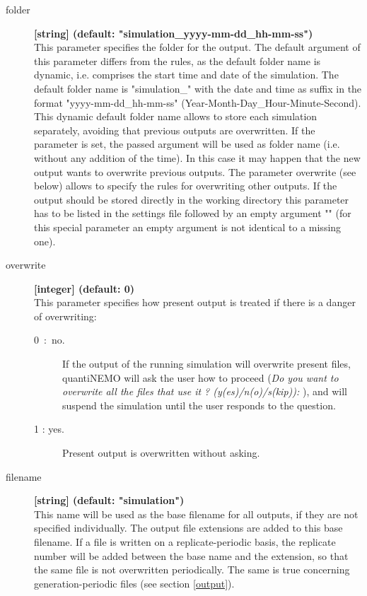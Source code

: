\documentclass[letterpaper,12pt,oneside]{book}
\begin{document}
\begin{description}
\item[folder]\textbf{[string] (default: "simulation\_yyyy-mm-dd\_hh-mm-ss")}\\
This parameter specifies the folder for the output. The default argument of this parameter differs from the rules, as the default folder name is dynamic, i.e. comprises the start time and date of the simulation. The default folder name is "simulation\_" with the date and time as suffix in the format "yyyy-mm-dd\_hh-mm-ss" (Year-Month-Day\_Hour-Minute-Second). This dynamic default folder name allows to store each simulation separately, avoiding that previous outputs are overwritten. If the parameter is set, the passed argument will be used as folder name (i.e. without any addition of the time). In this case it may happen that the new output wants to overwrite previous outputs. The parameter \textsf{overwrite} (see below) allows to specify the rules for overwriting other outputs. If the output should be stored directly in the working directory this parameter has to be listed in the settings file followed by an empty argument "" (for this special parameter an empty argument is not identical to a missing one).

\item[overwrite]\textbf{[integer] (default: 0)}\\
This parameter specifies how present output is treated if there is a danger of overwriting:
\begin{description}
\item[0~:~no.] If the output of the running simulation will overwrite present files, quantiNEMO will ask the user how to proceed (\textit{Do you want to overwrite all the files that use it ? (y(es)/n(o)/s(kip)):} ), and will suspend the simulation until the user responds to the question.
\item[1 : yes.] Present output is overwritten without asking.	
\end{description}


\item[filename]\textbf{[string] (default: "simulation")}\\
This name will be used as the base filename for all outputs, if they are not specified individually. The output file extensions are added to this base filename. If a file is written on a replicate-periodic basis, the replicate number will be added between the base name and the extension, so that the same file is not overwritten periodically. The same is true concerning generation-periodic files (see section \ref{output}).  


\end{description}
\end{document}
